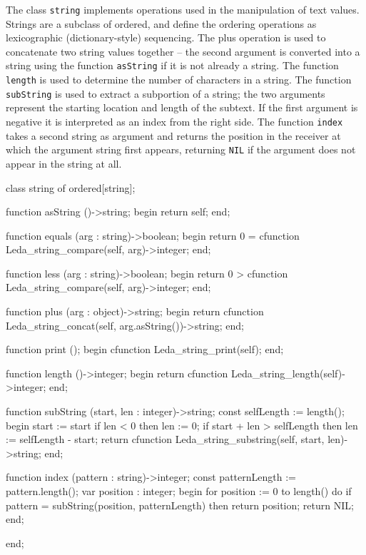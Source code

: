 The class {\tt string} implements operations used in the manipulation
of text values.  Strings are a subclass of ordered, and define
the ordering operations as lexicographic (dictionary-style)
sequencing.  The plus operation is used to concatenate
two string values together -- the second argument is converted
into a string using the function {\tt asString} if it is not
already a string.  The function {\tt length} is used to determine
the number of characters in a string.  The function {\tt subString}
is used to extract a subportion of a string; the two arguments represent
the starting location and length of the subtext.  If the first
argument is negative it is interpreted as an index from the right side.
The function {\tt index} takes a second string as argument and
returns the position in the receiver at which the argument string
first appears, returning {\tt NIL} if the argument does not appear
in the string at all.

\begin{cprog}

class string of ordered[string];
	
	function asString ()->string;
	begin
		return self;
	end;

	function equals (arg : string)->boolean;
	begin
		return 0 = cfunction
			Leda_string_compare(self, arg)->integer;
	end;

	function less (arg : string)->boolean;
	begin
		return 0 > cfunction
			Leda_string_compare(self, arg)->integer;
	end;

	function plus (arg : object)->string;
	begin
		return cfunction
			Leda_string_concat(self, arg.asString())->string;
	end;

	function print ();
	begin
		cfunction Leda_string_print(self);
	end;

	function length ()->integer;
	begin
		return cfunction Leda_string_length(self)->integer;
	end;

	function subString (start, len : integer)->string;
	const
		selfLength := length();
	begin
		start := start %
		if len < 0 then
			len := 0;
		if start + len > selfLength then
			len := selfLength - start;
		return cfunction
			Leda_string_substring(self, start, len)->string;
	end;

	function index (pattern : string)->integer;
	const
		patternLength := pattern.length();
	var
		position : integer;
	begin
		for position := 0 to length() do
			if pattern = subString(position, patternLength) then
				return position;
		return NIL;
	end;

end;

\end{cprog}

